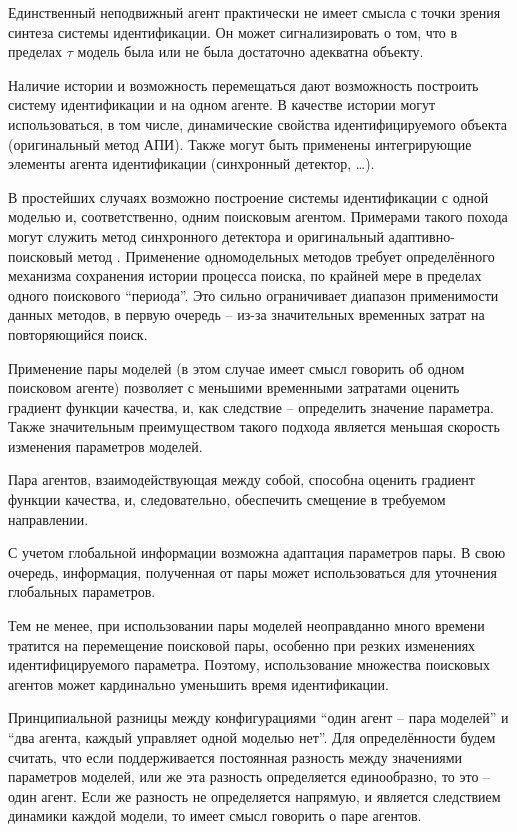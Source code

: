 Единственный неподвижный агент практически не имеет смысла
с точки зрения синтеза системы идентификации.
Он может сигнализировать о том, что в пределах
\(\tau\) модель была или не была достаточно адекватна
объекту.

Наличие истории и возможность перемещаться дают возможность
построить систему идентификации и на одном агенте.
В качестве истории могут использоваться, в том числе,
динамические свойства идентифицируемого объекта
(оригинальный метод АПИ). Также могут быть
применены интегрирующие элементы агента идентификации
(синхронный детектор, \ldots).

В простейших случаях возможно построение системы идентификации
с одной моделью и, соответственно, одним поисковым агентом.
Примерами такого похода могут служить
метод синхронного детектора \cite{adopt_cont_sys}
и оригинальный адаптивно-поисковый метод \cite{mich_92}.
Применение одномодельных методов требует определённого механизма
сохранения истории процесса поиска, по крайней мере в пределах
одного поискового ``периода''. Это сильно ограничивает диапазон
применимости данных методов, в первую очередь -- из-за значительных
временных затрат на повторяющийся поиск.

Применение пары моделей \cite{atu_asau3} 
(в этом случае имеет смысл говорить об одном поисковом агенте)
позволяет с меньшими временными затратами оценить градиент функции качества,
и, как следствие -- определить значение параметра. Также значительным преимуществом
такого подхода является меньшая скорость изменения параметров моделей.


Пара агентов, взаимодействующая между собой,
способна оценить градиент функции качества,
и, следовательно, обеспечить смещение в требуемом направлении.

С учетом глобальной информации возможна адаптация параметров пары.
В свою очередь, информация, полученная от пары может
использоваться для уточнения глобальных параметров.


Тем не менее, при использовании пары моделей неоправданно много времени
тратится на перемещение поисковой пары, особенно при резких изменениях
идентифицируемого параметра. Поэтому, использование множества
поисковых агентов может кардинально уменьшить время идентификации.

Принципиальной разницы между конфигурациями
``один агент -- пара моделей''
и
``два агента, каждый управляет одной моделью нет''.
Для определённости будем считать, что если поддерживается
постоянная разность между значениями параметров моделей,
или же эта разность определяется единообразно,
то это -- один агент. Если же разность
не определяется напрямую, и является следствием динамики каждой модели,
то имеет смысл говорить о паре агентов.

